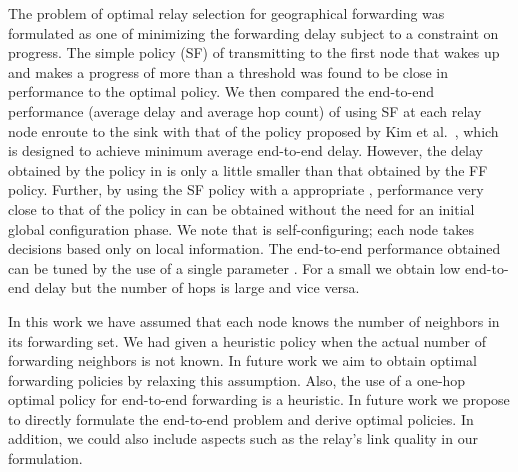 \documentclass[onecolumn]{IEEEtran}
\begin{document}
The problem of optimal relay selection for geographical forwarding was
formulated as one of minimizing the forwarding delay subject to a
constraint on progress.  The simple policy (SF)  of
transmitting to the first node that wakes up and makes a progress of
more than a threshold was found to be close in performance to the
optimal policy.  We then compared the end-to-end performance (average
delay and average hop count) of using SF at each relay node
enroute to the sink with that of the policy proposed by Kim et
al.~\cite{kim-etal09optimal-anycast}, which is designed to achieve
minimum average end-to-end delay. However, the delay obtained by the
 policy in \cite{kim-etal09optimal-anycast}  is only a little smaller than that obtained by the
FF policy.  Further, by using the SF policy with a
appropriate , performance very close to that of the policy in \cite{kim-etal09optimal-anycast}
can be obtained without the need for an initial global configuration
phase.  We note that  is self-configuring; each node takes
decisions based only on local information. The end-to-end performance
obtained can be tuned by the use of a single parameter .  For
a small  we obtain low end-to-end delay but the number of hops
is large and vice versa.

In this work we have assumed that each node knows the number of
neighbors in its forwarding set. We had given a heuristic policy
 when the actual number of forwarding neighbors is not
known. In future work we aim to obtain optimal forwarding policies by
relaxing this assumption. Also, the use of a one-hop optimal policy
for end-to-end forwarding is  a heuristic. In future work we
propose to directly formulate the end-to-end problem and derive
optimal policies. In addition, we could also include aspects such as
the relay's link quality  in our formulation.




\end{document}
